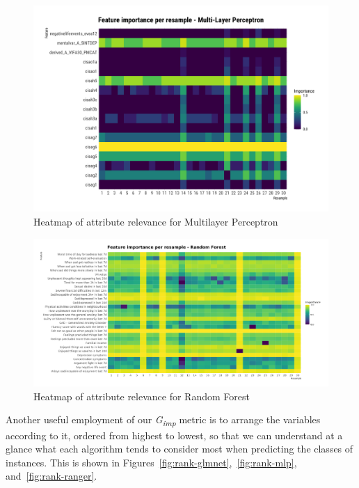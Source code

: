 \begin{figure}[H]
    \caption{Heatmap of attribute relevance for Multilayer Perceptron}
    \centerline{\includegraphics[scale=.21]{../reports/results/models_and_evals/summary/var_imp_resample_mlpML.png}}
    \label{fig:heatmap-mlp}
\end{figure}

\begin{figure}[H]
    \caption{Heatmap of attribute relevance for Random Forest}
    \centerline{\includegraphics[scale=.21]{../reports/results/models_and_evals/summary/var_imp_resample_ranger.png}}
    \label{fig:heatmap-ranger}
\end{figure}

\pagebreak

Another useful employment of our \textit{G\textsubscript{imp}} metric is to arrange the variables according to it, ordered from highest to lowest, so that we can understand at a glance what each algorithm tends to consider most when predicting the classes of instances.
This is shown in Figures~\ref{fig:rank-glmnet},~\ref{fig:rank-mlp}, and~\ref{fig:rank-ranger}.

